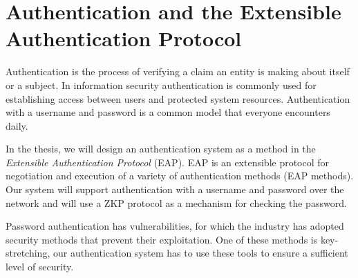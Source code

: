 \documentclass[12pt]{article}
\begin{document}
%	
%

	
	\section{Authentication and the Extensible Authentication Protocol}
	Authentication is the process of verifying a claim an entity is making about itself or a subject.
	In information security authentication is commonly used for establishing access between users and protected system resources.
	Authentication with a username and password is a common model that everyone encounters daily.
	
	In the thesis, we will design an authentication system as a method in the \textit{Extensible Authentication Protocol} (EAP).
	EAP \cite{aboba2004extensible} is an extensible protocol for negotiation and execution of a variety of authentication methods (EAP methods).
	Our system will support authentication with a username and password over the network and will use a ZKP protocol as a mechanism for checking the password.
	
	Password authentication has vulnerabilities, for which the industry has adopted security methods that prevent their exploitation.
	One of these methods is key-stretching, our authentication system has to use these tools to ensure a sufficient level of security.
	
\end{document}
